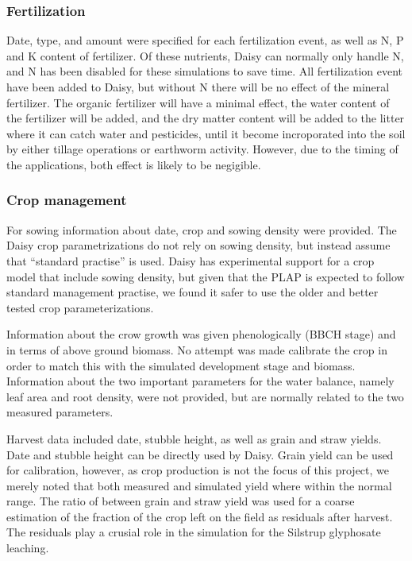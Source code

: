 \documentclass[a4paper]{article}
\begin{document}
\begin{text}
\subsubsection{Fertilization}

Date, type, and amount were specified for each fertilization event, as
well as N, P and K content of fertilizer.  Of these nutrients, Daisy
can normally only handle N, and N has been disabled for these
simulations to save time.  All fertilization event have been added to
Daisy, but without N there will be no effect of the mineral
fertilizer.  The organic fertilizer will have a minimal effect, the
water content of the fertilizer will be added, and the dry matter
content will be added to the litter where it can catch water and
pesticides, until it become incroporated into the soil by either
tillage operations or earthworm activity.  However, due to the timing
of the applications, both effect is likely to be negigible.

\subsubsection{Crop management}

For sowing information about date, crop and sowing density were
provided.  The Daisy crop parametrizations do not rely on sowing
density, but instead assume that ``standard practise'' is used.  Daisy
has experimental support for a crop model that include sowing density,
but given that the PLAP is expected to follow standard management
practise, we found it safer to use the older and better tested crop
parameterizations.

Information about the crow growth was given phenologically (BBCH
stage) and in terms of above ground biomass. No attempt was made
calibrate the crop in order to match this with the simulated
development stage and biomass.  Information about the two important
parameters for the water balance, namely leaf area and root density,
were not provided, but are normally related to the two measured
parameters.

Harvest data included date, stubble height, as well as grain and straw
yields.  Date and stubble height can be directly used by Daisy.  Grain
yield can be used for calibration, however, as crop production is not
the focus of this project, we merely noted that both measured and
simulated yield where within the normal range.  The ratio of between
grain and straw yield was used for a coarse estimation of the fraction
of the crop left on the field as residuals after harvest.  The
residuals play a crusial role in the simulation for the Silstrup
glyphosate leaching.


\end{text}
\end{document}
